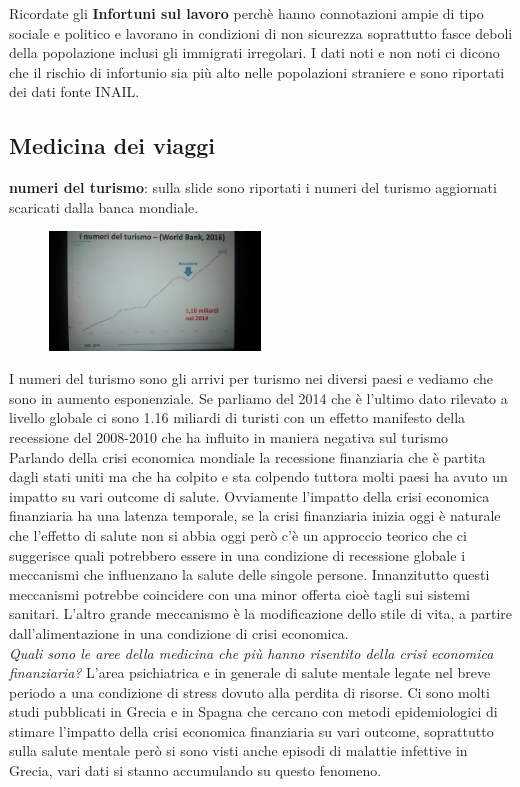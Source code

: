 Ricordate gli \textbf{Infortuni sul lavoro} perchè hanno connotazioni
ampie di tipo sociale e politico e lavorano in condizioni di non
sicurezza soprattutto fasce deboli della popolazione inclusi gli
immigrati irregolari. I dati noti e non noti ci dicono che il rischio di
infortunio sia più alto nelle popolazioni straniere e sono riportati dei
dati fonte INAIL.

\subsection{Medicina dei viaggi}

\textbf{numeri del turismo}: sulla slide sono riportati i numeri del
turismo aggiornati scaricati dalla banca mondiale.

\begin{figure}[!ht]
\centering
	\includegraphics[width=0.5\textwidth]{27/image5.jpeg}
	\end{figure}
	
I numeri del turismo sono gli arrivi per turismo nei diversi paesi e
vediamo che sono in aumento esponenziale. Se parliamo del 2014 che è
l'ultimo dato rilevato a livello globale ci sono 1.16 miliardi di
turisti con un effetto manifesto della recessione del 2008-2010 che ha
influito in maniera negativa sul turismo\\
Parlando della crisi economica mondiale la recessione finanziaria che è
partita dagli stati uniti ma che ha colpito e sta colpendo tuttora molti
paesi ha avuto un impatto su vari outcome di salute. Ovviamente
l'impatto della crisi economica finanziaria ha una latenza temporale, se
la crisi finanziaria inizia oggi è naturale che l'effetto di salute non
si abbia oggi però c'è un approccio teorico che ci suggerisce quali
potrebbero essere in una condizione di recessione globale i meccanismi
che influenzano la salute delle singole persone. Innanzitutto questi
meccanismi potrebbe coincidere con una minor offerta cioè tagli sui
sistemi sanitari. L'altro grande meccanismo è la modificazione dello
stile di vita, a partire dall'alimentazione in una condizione di crisi
economica.\\
\emph{Quali sono le aree della medicina che più hanno risentito della
crisi economica finanziaria?} L'area psichiatrica e in generale di
salute mentale legate nel breve periodo a una condizione di stress
dovuto alla perdita di risorse. Ci sono molti studi pubblicati in Grecia
e in Spagna che cercano con metodi epidemiologici di stimare l'impatto
della crisi economica finanziaria su vari outcome, soprattutto sulla
salute mentale però si sono visti anche episodi di malattie infettive in
Grecia, vari dati si stanno accumulando su questo fenomeno.

